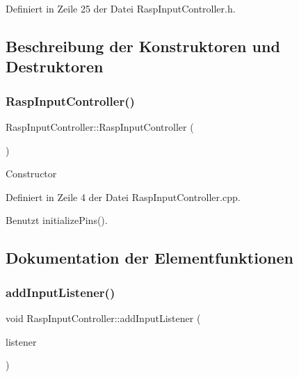 Definiert in Zeile 25 der Datei Rasp\+Input\+Controller.\+h.



\subsection{Beschreibung der Konstruktoren und Destruktoren}
\mbox{\label{class_rasp_input_controller_a63a9e2ab7d0eb5aed2da6068454caa65}} 
\subsubsection{\texorpdfstring{Rasp\+Input\+Controller()}{RaspInputController()}}
{\footnotesize\ttfamily Rasp\+Input\+Controller\+::\+Rasp\+Input\+Controller (\begin{DoxyParamCaption}{ }\end{DoxyParamCaption})}

Constructor 

Definiert in Zeile 4 der Datei Rasp\+Input\+Controller.\+cpp.



Benutzt initialize\+Pins().



\subsection{Dokumentation der Elementfunktionen}
\mbox{\label{class_rasp_input_controller_a31d6f6befaea44931f0010175bfe1a17}} 
\subsubsection{\texorpdfstring{add\+Input\+Listener()}{addInputListener()}}
{\footnotesize\ttfamily void Rasp\+Input\+Controller\+::add\+Input\+Listener (\begin{DoxyParamCaption}\item[{\hyperlink{class_input_listener}{Input\+Listener} \&}]{listener }\end{DoxyParamCaption})}

